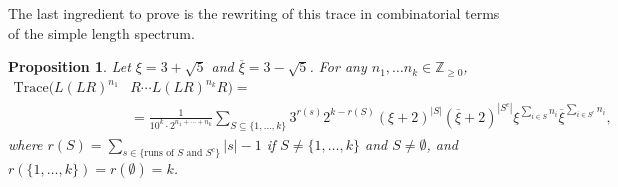 \documentclass[12pt,reqno]{amsart}
\numberwithin{equation}{part}
\theoremstyle{plain}
\newtheorem{proposition}[theorem]{Proposition}
\theoremstyle{definition}
\begin{document}
The last ingredient to prove is the rewriting of this trace in combinatorial terms of the simple length spectrum.
\begin{proposition} Let $\xi=3+\sqrt{5}$ and $\overline\xi=3-\sqrt{5}$. For any $n_1,\dots n_k\in \mathbb{Z}_{\geq0}$, 
\begin{align*}
\mathrm{Trace}(L(LR)^{n_1}&R \cdots L(LR)^{n_k}R)=\\&=\frac{1}{10^k\cdot 2^{n_1+\cdots +n_k}}\sum_{S\subseteq\{1,\hdots,k\}}3^{r(s)}2^{k-r(S)}(\xi+2)^{|S|}(\overline\xi+2)^{|S^c|}\xi^{\sum_{i\in S}n_i}\overline\xi^{\sum_{i\in S^c}n_i},
\end{align*}
where $r(S)=\sum_{s\in\{\text{runs of }S\text{ and }S^c\}}|s|-1$ if $S\neq \{1,\hdots, k\}$ and $S\neq\emptyset$, and $r(\{1,\hdots, k\})=r(\emptyset)=k$.
    
\end{proposition}
\end{document}
